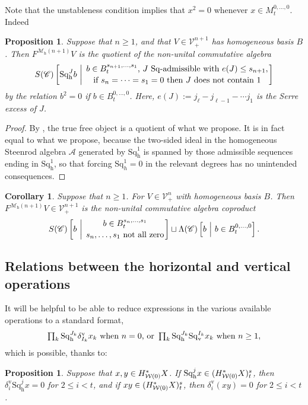 \documentclass[11pt]{amsart} \renewcommand{\baselinestretch}{1.2}
\theoremstyle{plain}
\newtheorem{prop}[thm]{Proposition}
\newtheorem{cor}[thm]{Corollary}
\numberwithin{equation}{section} %
\theoremstyle{plain}
\newtheorem{prop}[thm]{Proposition}
\newtheorem{cor}[thm]{Corollary}
\numberwithin{equation}{chapter} %
\newcommand{\scrC}{\mathscr{C}}
\newcommand{\calA}{\mathcal{A}}
\newcommand{\calV}{\mathcal{V}}
\newcommand{\calw}{\mathcal{W}}
\newcommand{\calMh}{\mathcal{M}\dhor}
\newcommand{\citeBOX}[2][]{\cite[\mbox{#1}]{#2}}
\newcommand{\CommOperad}{{\scrC}}
\newcommand{\vect}[2]{\calV^{#1}_{#2}}
\newcommand{\excess}{e}
\newcommand{\Sq}{\mathrm{Sq}}
\newcommand{\LieSteen}{\calA}
\newcommand{\uver}{^\mathrm{v}}
\newcommand{\dver}{_\mathrm{v}}
\newcommand{\dhor}{_\mathrm{h}}
\newcommand{\Sqh}{\mathrm{Sq}\dhor}
\newcommand{\Sqv}{\mathrm{Sq}\dver}
\newcommand{\deltav}{\delta\uver}
\newcommand{\SubsectionOrSection}[1]{\subsection{#1}}
\begin{document}
\begin{Cohomology Operations for W and U}
Note that the unstableness condition implies that $x^2=0$ whenever $x\in M_t^{0,\ldots,0}$. Indeed
\begin{prop}
\label{basis of free horizontal operations algebra}
Suppose that $n\geq1$, and that $V\in\vect{n+1}{+}$ has homogeneous basis $B$. Then $F^{\calMh(n+1)}V$ is the quotient of the non-unital commutative algebra
\[S(\CommOperad) \left[\Sqh^Jb\ \middle|\ \genfrac{}{}{0pt}{}{b\in B^{s_{n+1},\ldots,s_1}_t\textup{, $J$ $\Sq$-admissible with }\excess(J)\leq s_{n+1},}{\textup{if }s_{n}=\cdots=s_1=0\textup{ then $J$ does not contain 1}}\right]\]
by the relation $b^2=0$ if $b\in B_t^{0,\ldots,0}$. Here, $e(J):=j_\ell-j_{\ell-1}-\cdots j_1$ is the Serre excess of $J$.
\end{prop}
\begin{proof}
By \citeBOX[6.1]{PriddySimplicialLie.pdf}, the true free object is a quotient of what we propose. It is in fact equal to what we propose, because the two-sided ideal in the homogeneous Steenrod algebra $\LieSteen$ generated by $\Sqh^1$ is spanned by those admissible sequences ending in $\Sqh^1$, so that forcing $\Sq^1_h=0$ in the relevant degrees has no unintended consequences. %
\end{proof}
\begin{cor}
\label{basis of free horizontal operations algebra restricted}
Suppose that $n\geq1$. For $V\in\vect{n}{+}$ with homogeneous basis $B$. Then $F^{\calMh(n+1)}V\in\vect{n+1}{+}$ is the non-unital commutative algebra coproduct
\[S(\CommOperad) \left[b\ \middle|\ \genfrac{}{}{0pt}{}{b\in B^{s_{n},\ldots,s_1}_t}{s_{n},\ldots,s_1\textup{ not all zero}}\right]\sqcup\Lambda(\CommOperad) \left[b\ \middle|\ b\in B^{0,\ldots,0}_t\right].\]
\end{cor}

\SubsectionOrSection{Relations between the horizontal and vertical operations}
\label{Relations between the horizontal and vertical operations}
It will be helpful to be able to reduce %
expressions in the various available operations to a standard format,
\[\textstyle\prod_k \Sqh^{J_{k}}\deltav_{I_{k}}x_k\textup{ when $n=0$, or }\prod_k \Sqh^{J_{k}}\Sqv^{I_{k}}x_k\textup{ when $n\geq1$},\]
which is possible, thanks to:
\begin{prop}
\label{rearrange horiz and vert ops}
Suppose that $x,y\in H^*_{\smash{\calw(0)}}X$. If $\Sqh^jx\in (H^*_{\smash{\calw(0)}}X)^{s}_{t}$, then $\deltav_i\Sqh^{j}x=0$ for  $2\leq i<t$, and if $xy\in (H^*_{\smash{\calw(0)}}X)^{s}_{t}$, then $\deltav_i(xy)=0$ for  $2\leq i<t$.


\end{prop}
\end{Cohomology Operations for W and U}
\end{document}

